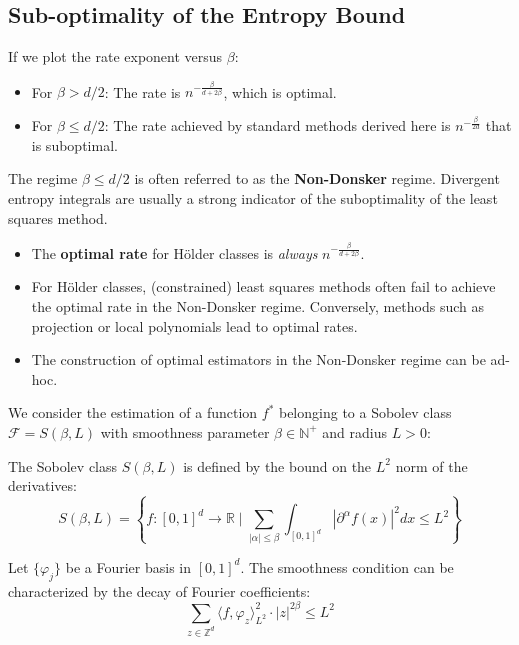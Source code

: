 \subsection{Sub-optimality of the Entropy Bound}
If we plot the rate exponent versus $\beta$:
\begin{itemize}
    \item For $\beta > d/2$: The rate is $n^{-\frac{\beta}{d+2\beta}}$, which is optimal.
    \item For $\beta \leq d/2$: The rate achieved by standard methods derived here is $n^{-\frac{\beta}{2d}}$ that is suboptimal.
\end{itemize}
\begin{remark}
    The regime $\beta \le d/2$ is often referred to as the \textbf{Non-Donsker} regime. Divergent entropy integrals are usually a strong indicator of the suboptimality of the least squares method.
\end{remark}
\begin{remark}
    \begin{itemize}
    \item The \textbf{optimal rate} for Hölder classes is \textit{always} $n^{-\frac{\beta}{d+2\beta}}$.
    \item For Hölder classes, (constrained) least squares methods often fail to achieve the optimal rate in the Non-Donsker regime. Conversely, methods such as projection or local polynomials lead to optimal rates.
    \item The construction of optimal estimators in the Non-Donsker regime can be ad-hoc.
\end{itemize}
\end{remark}

We consider the estimation of a function $f^*$ belonging to a Sobolev class $\mathcal{F} = S(\beta, L)$ with smoothness parameter $\beta \in \mathbb{N}^+$ and radius $L > 0$:
\begin{de}
    The Sobolev class $S(\beta, L)$ is defined by the bound on the $L^2$ norm of the derivatives:
\begin{equation*}
    S(\beta, L) = \left\{ f : [0,1]^d \to \mathbb{R} \;\Bigg|\; \sum_{|\alpha| \le \beta} \int_{[0,1]^d} |\partial^\alpha f(x)|^2 dx \le L^2 \right\}
\end{equation*}
\end{de}


\begin{remark}
    Let $\{ \varphi_j \}$ be a Fourier basis in $[0, 1]^d$. The smoothness condition can be characterized by the decay of Fourier coefficients:
\begin{equation*}
    \sum_{z \in \mathbb{Z}^d} \langle f, \varphi_z \rangle_{L^2}^2 \cdot |z|^{2\beta} \le L^2
\end{equation*}
\end{remark}

